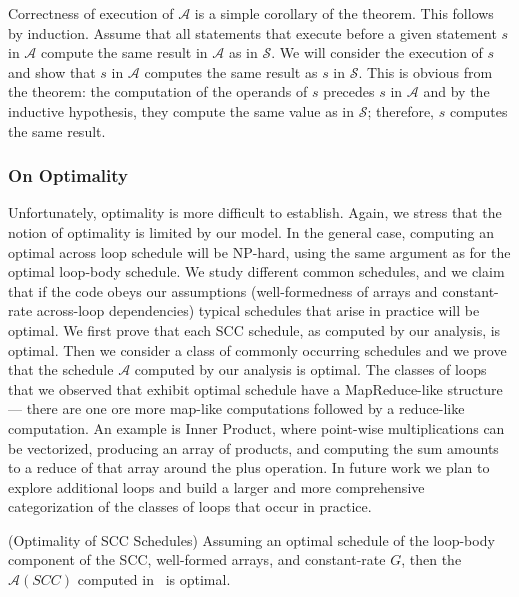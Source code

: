 Correctness of execution of $\mathcal{A}$ is a simple corollary of the theorem. This follows by induction. Assume that all statements that 
execute before a given statement $s$ in $\mathcal{A}$ compute the same result in $\mathcal{A}$ as in $\mathcal{S}$. We will consider 
the execution of $s$ and show that $s$ in $\mathcal{A}$ computes the same result as $s$ in $\mathcal{S}$. This is obvious from the 
theorem: the computation of the operands of $s$ precedes $s$ in $\mathcal{A}$ and by the inductive hypothesis, they compute the
same value as in $\mathcal{S}$; therefore, $s$ computes the same result. %

\subsubsection{On Optimality}

Unfortunately, optimality is more difficult to establish. Again, we stress that the notion of optimality is limited by our model. 
In the general case, computing an optimal across loop schedule will be NP-hard,
using the same argument as for the optimal loop-body schedule. We study different common schedules, and we claim that if the code
obeys our assumptions (well-formedness of arrays and constant-rate across-loop dependencies) typical schedules that arise in practice
will be optimal. We first prove that each SCC schedule, as computed by our analysis, is optimal. Then we consider a class of commonly occurring schedules
and we prove that the schedule $\mathcal{A}$ computed by our analysis is optimal. The classes of loops that we observed that exhibit optimal schedule
have a MapReduce-like structure --- there are one ore more map-like computations followed by a reduce-like computation. An example is Inner Product,
where point-wise multiplications can be vectorized, producing an array of products, and computing the sum amounts to a reduce of that array around 
the plus operation. In future work we plan to explore additional loops and build a larger and more comprehensive categorization of the classes
of loops that occur in practice.


\begin{lemma}(Optimality of SCC Schedules) Assuming an optimal schedule of the loop-body component of the SCC, well-formed arrays, 
and constant-rate $G$, then the $\mathcal{A}(SCC)$ computed in~ is optimal.
\end{lemma}

